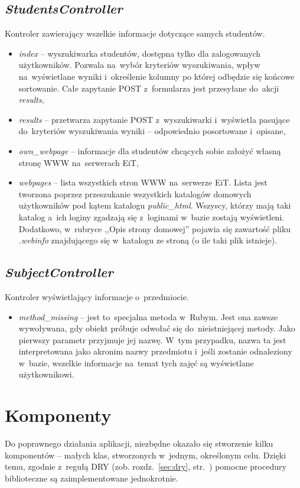 \documentclass[a4paper,12pt,oneside]{report}
\begin{document}
\subsection{\emph{StudentsController}}
\label{con:students}
  Kontroler zawierający wszelkie informacje dotyczące samych studentów.
\begin{itemize}
  \item \emph{index} -- wyszukiwarka studentów, dostępna tylko dla zalogowanych użytkowników. Pozwala na~wybór kryteriów wyszukiwania, wpływ na~wyświetlane wyniki i~określenie kolumny po której odbędzie się końcowe sortowanie. Całe zapytanie POST z~formularza jest przesyłane do~akcji \emph{results},
  \item \emph{results} -- przetwarza zapytanie POST z~wyszukiwarki i~wyświetla pasujące do~kryteriów wyszukiwania wyniki -- odpowiednio posortowane i~opisane,
  \item \emph{own\_webpage} -- informacje dla studentów chcących sobie założyć własną stronę WWW na~serwerach EiT,
  \item \emph{webpages} -- lista wszystkich stron WWW na~serwerze EiT. Lista jest tworzona poprzez przeszukanie wszystkich katalogów domowych użytkowników pod kątem katalogu \emph{public\_html}. Wszyscy, którzy mają taki katalog a~ich loginy zgadzają się z~loginami w~bazie zostają wyświetleni. Dodatkowo, w~rubryce ,,Opis strony domowej'' pojawia się zawartość pliku \emph{.webinfo} znajdującego się w~katalogu ze stroną (o ile taki plik istnieje).
\end{itemize}

\subsection{\emph{SubjectController}}
\label{con:subject}
  Kontroler wyświetlający informacje o~przedmiocie.
\begin{itemize}
  \item \emph{method\_missing} -- jest to~specjalna metoda w~Rubym. Jest ona zawsze wywoływana, gdy obiekt próbuje odwołać się do~nieistniejącej metody. Jako pierwszy parametr przyjmuje jej nazwę. W~tym przypadku, nazwa ta jest interpretowana jako akronim nazwy przedmiotu i~jeśli zostanie odnaleziony w~bazie, wszelkie informacje na~temat tych zajęć są wyświetlane użytkownikowi.
\end{itemize}

\section{Komponenty}
\label{sec:components}
Do poprawnego działania aplikacji, niezbędne okazało się stworzenie kilku komponentów -- małych klas, stworzonych w~jednym, określonym celu. Dzięki temu, zgodnie z~regułą DRY (zob. rozdz.~\ref{sec:dry}, str.~\pageref{sec:dry}) pomocne procedury biblioteczne są zaimplementowane jednokrotnie.
\end{document}
